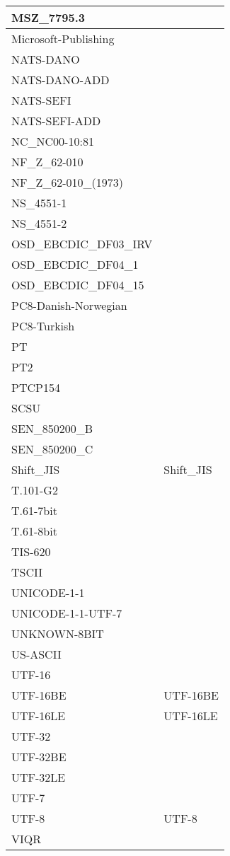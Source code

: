 \documentclass{wg21}
\begin{document}
\begin{longtable}{| p{} | p{} |}
MSZ_7795.3 & \\ \hline
Microsoft-Publishing & \\ \hline
NATS-DANO & \\ \hline
NATS-DANO-ADD & \\ \hline
NATS-SEFI & \\ \hline
NATS-SEFI-ADD & \\ \hline
NC_NC00-10:81 & \\ \hline
NF_Z_62-010 & \\ \hline
NF_Z_62-010_(1973) & \\ \hline
NS_4551-1 & \\ \hline
NS_4551-2 & \\ \hline
OSD_EBCDIC_DF03_IRV & \\ \hline
OSD_EBCDIC_DF04_1 & \\ \hline
OSD_EBCDIC_DF04_15 & \\ \hline
PC8-Danish-Norwegian & \\ \hline
PC8-Turkish & \\ \hline
PT & \\ \hline
PT2 & \\ \hline
PTCP154 & \\ \hline
SCSU & \\ \hline
SEN_850200_B & \\ \hline
SEN_850200_C & \\ \hline
Shift_JIS & Shift_JIS\\ \hline
T.101-G2 & \\ \hline
T.61-7bit & \\ \hline
T.61-8bit & \\ \hline
TIS-620 & \\ \hline
TSCII & \\ \hline
UNICODE-1-1 & \\ \hline
UNICODE-1-1-UTF-7 & \\ \hline
UNKNOWN-8BIT & \\ \hline
US-ASCII & \\ \hline
UTF-16 & \\ \hline
UTF-16BE & UTF-16BE\\ \hline
UTF-16LE & UTF-16LE\\ \hline
UTF-32 & \\ \hline
UTF-32BE & \\ \hline
UTF-32LE & \\ \hline
UTF-7 & \\ \hline
UTF-8 & UTF-8\\ \hline
VIQR & \\ \hline

\end{longtable}
\end{document}
